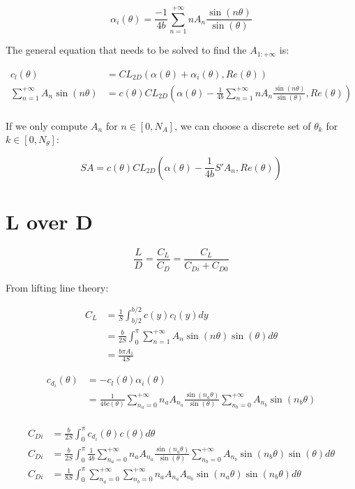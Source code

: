 \documentclass[letterpaper,12pt]{article}
\begin{document}
$$ \alpha_i(\theta) = \frac {-1}{4b}  \sum_{n=1}^{+\infty} n A_n \frac{ \sin(n\theta) }{\sin(\theta)} 	$$

The general equation that needs to be solved to find the $A_{1:+\infty}$ is:

\begin{align*}
	c_l(\theta) &= CL_{2D} \left( \alpha(\theta) + \alpha_i(\theta), Re(\theta)\right) \\
	\sum_{n=1}^{+\infty} A_n \sin(n\theta) &= c(\theta) CL_{2D} \left( \alpha(\theta) - \frac {1}{4b}  \sum_{n=1}^{+\infty} n A_n \frac{ \sin(n\theta) }{\sin(\theta)} , Re(\theta)\right) \\
\end{align*}

If we only compute $A_{n}$ for $n \in [0, N_A]$, we can choose a discrete set of $\theta_k$ for $k \in [0, N_{\theta}]$:

\begin{equation}
	SA = c(\theta) CL_{2D} \left( \alpha(\theta) - \frac {1}{4b} S' A_n , Re(\theta)\right) 
\end{equation}

\section{L over D}

\begin{equation*}
	\frac L D = \frac{C_L}{C_D} = \frac {C_L} {C_{Di} + C_{D0}} 
\end{equation*}

From lifting line theory:

\begin{align}
	C_L &= \frac 1 S \int_{b/2}^{b/2} c(y) c_l(y) dy  \nonumber \\
		&= \frac b {2S} \int_{0}^{\pi} \sum_{n=1}^{+\infty} A_n \sin(n\theta) \sin(\theta)d\theta \nonumber \\
		& = \frac{b \pi A_1}{4S}
\end{align}

\begin{align*}
	c_{d_i} (\theta) &= - c_l (\theta) \alpha_i (\theta) \\
					&=  \frac{1}{4bc(\theta)}\sum_{n_a=0}^{+\infty} n_a A_{n_a} \frac{ \sin(n_a\theta) }{\sin(\theta)} \sum_{n_b=0}^{+\infty} A_{n_b} \sin(n_b\theta) \\
\end{align*}

\begin{align}
	C_{Di} &= \frac b {2S} \int_{0}^{\pi} c_{d_i}(\theta) c(\theta) d\theta \nonumber\\
	C_{Di} &= \frac b {2S} \int_{0}^{\pi} \frac{1}{4b}
		\sum_{n_a=0}^{+\infty} n_a A_{n_a} \frac{ \sin(n_a\theta) }{\sin(\theta)} 
		\sum_{n_b=0}^{+\infty} A_{n_b} \sin(n_b\theta) \sin(\theta) 
		d\theta  \nonumber \\ 
	C_{Di} &= \frac 1 {8S} \int_{0}^{\pi} \sum_{n_a=0}^{+\infty} \sum_{n_b=0}^{+\infty} n_a A_{n_a}A_{n_b} \sin(n_a\theta) \sin(n_b\theta) d\theta
\end{align}
\end{document}
